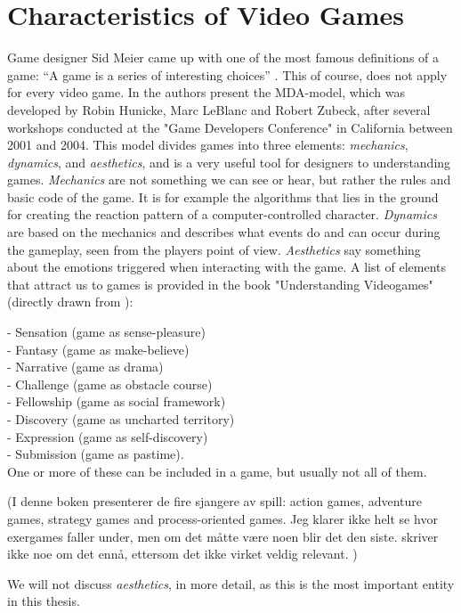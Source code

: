 \chapter{Characteristics of Video Games}
Game designer Sid Meier came up with one of the most famous definitions of a game: “A game is a series of interesting choices” \cite{understandingvg}. This of course, does not apply for every video game. In \cite{understandingvg} the authors present the MDA-model, which was developed by Robin Hunicke, Marc LeBlanc and Robert Zubeck, after several workshops conducted at the "Game Developers Conference" in California between 2001 and 2004. This model divides games into three elements: \emph{mechanics}, \emph{dynamics}, and \emph{aesthetics}, and is a very useful tool for designers to understanding games. \emph{Mechanics} are not something we can see or hear, but rather the rules and basic code of the game. It is for example the algorithms that lies in the ground for creating the reaction pattern of a computer-controlled character. \emph{Dynamics} are based on the mechanics and describes what events do and can occur during the gameplay, seen from the players point of view. \emph{Aesthetics} say something about the emotions triggered when interacting with the game. A list of elements  that attract us to games is provided in the book "Understanding Videogames" (directly drawn from \cite{understandingvg}): 

- Sensation (game as sense-pleasure)\\
- Fantasy (game as make-believe)\\
- Narrative (game as drama)\\
- Challenge (game as obstacle course)\\
- Fellowship (game as social framework)\\
- Discovery (game as uncharted territory)\\
- Expression (game as self-discovery)\\
- Submission (game as pastime).\\
One or more of these can be included in a game, but usually not all of them.

(I denne boken presenterer de fire sjangere av spill: action games, adventure games, strategy games and process-oriented games. Jeg klarer ikke helt se hvor exergames faller under, men om det måtte være noen blir det den siste. skriver ikke noe om det ennå, ettersom det ikke virket veldig relevant. )

We will not discuss \emph{aesthetics}, in more detail, as this is the most important entity in this thesis. 

